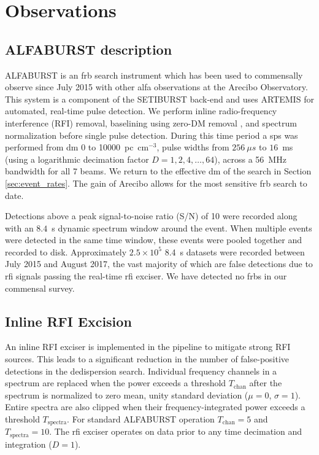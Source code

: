 \documentclass[a4paper,fleqn,usenatbib]{mnras}
\begin{document}
\section{Observations}
\label{sec:overview}

\subsection{ALFABURST description}

ALFABURST is an \gls{frb} search instrument which has been used to commensally
observe since July 2015 with other \gls{alfa} observations at the Arecibo
Observatory. This system is a component of the SETIBURST back-end
\citep{2017ApJS..228...21C} and uses ARTEMIS \citep{2015MNRAS.452.1254K} for
automated, real-time pulse detection. We perform inline radio-frequency
interference (RFI) removal, baselining using zero-DM removal
\citep{2009MNRAS.395..410E}, and spectrum normalization before single pulse
detection. During this time period a \gls{sps} was performed from \gls{dm} 0 to
10000~pc~cm$^{-3}$, pulse widths from $256~\mu s$ to $16$~ms (using a logarithmic
decimation factor $D=1,2,4,\ldots,64$), across a 56~MHz bandwidth for
all 7 beams. We return to the effective \gls{dm} of the search in Section
\ref{sec:event_rates}. The gain of Arecibo allows for the most sensitive
\gls{frb} search to date.

Detections above a peak signal-to-noise ratio (S/N) of 10 were recorded along
with an $8.4$~s dynamic spectrum window around the event. When multiple events
were detected in the same time window, these events were pooled together and
recorded to disk.  Approximately $2.5 \times 10^5$ 8.4~s datasets were recorded
between July 2015 and August 2017, the vast majority of which are false
detections due to \gls{rfi} signals passing the real-time \gls{rfi} exciser. We
have detected no \glspl{frb} in our commensal survey.


\subsection{Inline RFI Excision}
\label{sec:rfi_excise}

An inline RFI exciser is implemented in the pipeline to mitigate strong RFI
sources. This leads to a significant reduction in the number of false-positive
detections in the dedispersion search.  Individual frequency channels in a
spectrum are replaced when the power exceeds a threshold $T_{\textrm{chan}}$
after the spectrum is normalized to zero mean, unity standard deviation
($\mu=0$, $\sigma=1$). Entire spectra are also clipped when their
frequency-integrated power exceeds a threshold $T_{\textrm{spectra}}$. For
standard ALFABURST operation $T_{\textrm{chan}} = 5$ and $T_{\textrm{spectra}} =
10$.  The \gls{rfi} exciser operates on data prior to any time decimation and 
integration ($D=1$).
\end{document}
